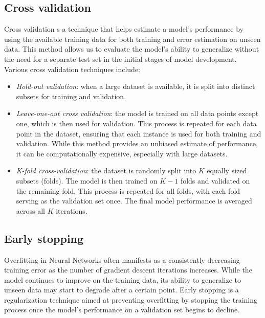 \subsection{Cross validation}
Cross validation s a technique that helps estimate a model's performance by using the available training data for both training and error estimation on unseen data. 
This method allows us to evaluate the model's ability to generalize without the need for a separate test set in the initial stages of model development.
Various cross validation techniques include:
\begin{itemize}
    \item \textit{Hold-out validation}: when a large dataset is available, it is split into distinct subsets for training and validation. 
    \item \textit{Leave-one-out cross validation}: the model is trained on all data points except one, which is then used for validation. 
        This process is repeated for each data point in the dataset, ensuring that each instance is used for both training and validation. 
        While this method provides an unbiased estimate of performance, it can be computationally expensive, especially with large datasets.
    \item \textit{K-fold cross-validation}: the dataset is randomly split into $K$ equally sized subsets (folds).
        The model is then trained on $K-1$ folds and validated on the remaining fold.
        This process is repeated for all folds, with each fold serving as the validation set once.
        The final model performance is averaged across all $K$ iterations. 
\end{itemize}

\subsection{Early stopping}
Overfitting in Neural Networks often manifests as a consistently decreasing training error as the number of gradient descent iterations increases. 
While the model continues to improve on the training data, its ability to generalize to unseen data may start to degrade after a certain point. 
Early stopping is a regularization technique aimed at preventing overfitting by stopping the training process once the model's performance on a validation set begins to decline.

